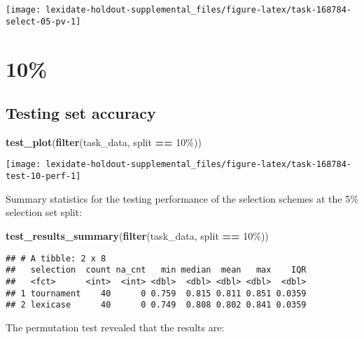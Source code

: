 \documentclass[
]{book}
\newenvironment{Shaded}{\begin{snugshade}}{\end{snugshade}}
\newcommand{\FunctionTok}[1]{\textcolor[rgb]{0.13,0.29,0.53}{\textbf{#1}}}
\newcommand{\NormalTok}[1]{#1}
\newcommand{\SpecialCharTok}[1]{\textcolor[rgb]{0.81,0.36,0.00}{\textbf{#1}}}
\newcommand{\StringTok}[1]{\textcolor[rgb]{0.31,0.60,0.02}{#1}}
\begin{document}
\texttt{[image: lexidate-holdout-supplemental\_files/figure-latex/task-168784-select-05-pv-1]}

\hypertarget{section-51}{%
\section{10\%}\label{section-51}}

\hypertarget{testing-set-accuracy-51}{%
\subsection{Testing set accuracy}\label{testing-set-accuracy-51}}

\begin{Shaded}
\begin{Highlighting}[]
\FunctionTok{test\_plot}\NormalTok{(}\FunctionTok{filter}\NormalTok{(task\_data, split }\SpecialCharTok{==} \StringTok{\textquotesingle{}10\%\textquotesingle{}}\NormalTok{))}
\end{Highlighting}
\end{Shaded}

\texttt{[image: lexidate-holdout-supplemental\_files/figure-latex/task-168784-test-10-perf-1]}

Summary statistics for the testing performance of the selection schemes at the 5\% selection set split:

\begin{Shaded}
\begin{Highlighting}[]
\FunctionTok{test\_results\_summary}\NormalTok{(}\FunctionTok{filter}\NormalTok{(task\_data, split }\SpecialCharTok{==} \StringTok{\textquotesingle{}10\%\textquotesingle{}}\NormalTok{))}
\end{Highlighting}
\end{Shaded}

\begin{verbatim}
## # A tibble: 2 x 8
##   selection  count na_cnt   min median  mean   max    IQR
##   <fct>      <int>  <int> <dbl>  <dbl> <dbl> <dbl>  <dbl>
## 1 tournament    40      0 0.759  0.815 0.811 0.851 0.0359
## 2 lexicase      40      0 0.749  0.808 0.802 0.841 0.0359
\end{verbatim}

The permutation test revealed that the results are:
\end{document}
